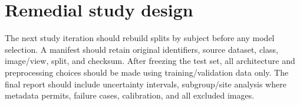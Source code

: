 \section{Remedial study design}
The next study iteration should rebuild splits by subject before any model selection. A manifest should retain original identifiers, source dataset, class, image/view, split, and checksum. After freezing the test set, all architecture and preprocessing choices should be made using training/validation data only. The final report should include uncertainty intervals, subgroup/site analysis where metadata permits, failure cases, calibration, and all excluded images.
